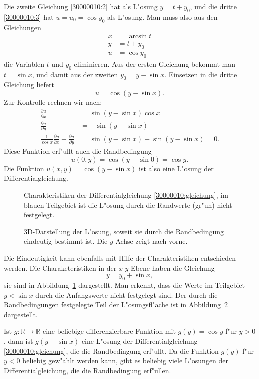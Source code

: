 \begin{loesung}
\begin{teilaufgaben}
Die zweite Gleichung \eqref{30000010:2} hat als L"osung $y=t+y_0$, und
die dritte \eqref{30000010:3} hat $u=u_0=\cos y_0$ als L"osung.
Man muss also aus den Gleichungen
\begin{align*}
x&=\arcsin t\\
y&=t+y_0\\
u&=\cos y_0
\end{align*}
die Variablen $t$ und $y_0$ eliminieren.
Aus der ersten Gleichung bekommt man $t=\sin x$, und damit aus der zweiten
$y_0=y-\sin x$. Einsetzen in die dritte Gleichung liefert
\begin{equation}
u=\cos(y-\sin x).
\end{equation}
Zur Kontrolle rechnen wir nach:
\begin{align*}
\frac{\partial u}{\partial x}&=\sin(y-\sin x)\cos x
\\
\frac{\partial u}{\partial y}&=-\sin(y-\sin x)
\\
\frac1{\cos x}\frac{\partial u}{\partial x}+\frac{\partial u}{\partial y}
&=
\sin(y-\sin x)-\sin(y-\sin x)=0.
\end{align*}
Diese Funktion erf"ullt auch die Randbedingung
\begin{equation*}
u(0,y)=\cos(y-\sin 0)=\cos y.
\end{equation*}
Die Funktion $u(x,y)=\cos(y-\sin x)$ ist also eine L"osung der
Differentialgleichung.
\item
\begin{figure}
\centering
{}
\caption{Charakteristiken der Differentialgleichung \eqref{30000010:gleichung},
im blauen Teilgebiet ist die L"osung durch die Randwerte (gr"un) nicht
festgelegt.
\label{30000010:char}}
\end{figure}
\begin{figure}
\centering
{}
\caption{3D-Darstellung der L"osung, soweit sie durch die Randbedingung
eindeutig bestimmt ist. Die $y$-Achse zeigt nach vorne.
\label{30000010:loesungsflaeche}}
\end{figure}
Die Eindeutigkeit kann ebenfalls mit Hilfe der Charakteristiken entschieden
werden.
Die Charaketeristiken in der $x$-$y$-Ebene haben die Gleichung
\[
y=y_0 + \sin x,
\]
sie sind in Abbildung~\ref{30000010:char} dargestellt.
Man erkennt, dass die Werte im Teilgebiet $y < \sin x$ durch die
Anfangswerte nicht festgelegt sind.
Der durch die Randbedingungen festgelegte Teil der L"osungsfl"ache ist
in Abbildung~\ref{30000010:loesungsflaeche} dargestellt.

Ist $g\colon\mathbb R\to\mathbb R$ eine beliebige differenzierbare Funktion mit
$g(y)=\cos y$ f"ur $y>0$, dann ist $g(y-\sin x)$ eine L"osung der
Differentialgleichung \eqref{30000010:gleichung}, die die Randbedingung
erf"ullt. Da die Funktion $g(y)$ f"ur $y<0$ beliebig gew"ahlt werden
kann, gibt es beliebig viele L"osungen der Differentialgleichung,
die die Randbedingung erf"ullen.
\qedhere
\end{teilaufgaben}
\end{loesung}

